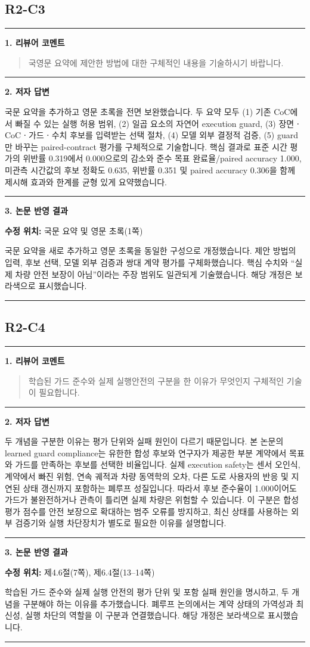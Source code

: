 \documentclass[11pt]{article}
\newcommand{\fieldheading}[2]{%
  \par\medskip\noindent
  {\color{#1}\rule{3pt}{1.25em}}\hspace{0.55em}\textbf{#2}\par\smallskip}
\newenvironment{reviewitem}[1]
  {\subsection*{#1}}
  {\par\medskip\hrule\bigskip}
\newenvironment{reviewercomment}
  {\fieldheading{reviewercolor}{1. 리뷰어 코멘트}%
   \begin{quote}}
  {\end{quote}}
\newenvironment{authorresponse}
  {\fieldheading{responsecolor}{2. 저자 답변}}
  {\par}
\newenvironment{manuscriptrevision}[1]
  {\fieldheading{revisioncolor}{3. 논문 반영 결과}%
   \textbf{수정 위치:} #1\par\smallskip}
  {\par}
\begin{document}
\begin{reviewitem}{R2-C3}
  \begin{reviewercomment}
    국영문 요약에 제안한 방법에 대한 구체적인 내용을 기술하시기 바랍니다.
  \end{reviewercomment}

  \begin{authorresponse}
    국문 요약을 추가하고 영문 초록을 전면 보완했습니다. 두 요약 모두 (1) 기존
    CoC에서 빠질 수 있는 실행 허용 범위, (2) 일곱 요소의 자연어 execution guard,
    (3) 장면ㆍCoCㆍ가드ㆍ수치 후보를 입력받는 선택 절차, (4) 모델 외부 결정적
    검증, (5) guard만 바꾸는 paired-contract 평가를 구체적으로 기술합니다.
    핵심 결과로 표준 시간 평가의 위반률 0.319에서 0.000으로의 감소와 준수 목표
    완료율/paired accuracy 1.000, 미관측 시간값의 후보 정확도 0.635, 위반률
    0.351 및 paired accuracy 0.306을 함께 제시해 효과와 한계를 균형 있게
    요약했습니다.
  \end{authorresponse}

  \begin{manuscriptrevision}{국문 요약 및 영문 초록(1쪽)}
    국문 요약을 새로 추가하고 영문 초록을 동일한 구성으로 개정했습니다. 제안
    방법의 입력, 후보 선택, 모델 외부 검증과 쌍대 계약 평가를 구체화했습니다.
    핵심 수치와 ``실제 차량 안전 보장이 아님''이라는 주장 범위도 일관되게
    기술했습니다. 해당 개정은 보라색으로 표시했습니다.
  \end{manuscriptrevision}
\end{reviewitem}

\begin{reviewitem}{R2-C4}
  \begin{reviewercomment}
    학습된 가드 준수와 실제 실행안전의 구분을 한 이유가 무엇인지 구체적인 기술이
    필요합니다.
  \end{reviewercomment}

  \begin{authorresponse}
    두 개념을 구분한 이유는 평가 단위와 실패 원인이 다르기 때문입니다. 본 논문의
    learned guard compliance는 유한한 합성 후보와 연구자가 제공한 부분 계약에서
    목표와 가드를 만족하는 후보를 선택한 비율입니다. 실제 execution safety는
    센서 오인식, 계약에서 빠진 위험, 연속 궤적과 차량 동역학의 오차, 다른 도로
    사용자의 반응 및 지연된 상태 갱신까지 포함하는 폐루프 성질입니다. 따라서
    후보 준수율이 1.000이어도 가드가 불완전하거나 관측이 틀리면 실제 차량은
    위험할 수 있습니다. 이 구분은 합성 평가 점수를 안전 보장으로 확대하는 범주
    오류를 방지하고, 최신 상태를 사용하는 외부 검증기와 실행 차단장치가 별도로
    필요한 이유를 설명합니다.
  \end{authorresponse}

  \begin{manuscriptrevision}{제4.6절(7쪽), 제6.4절(13--14쪽)}
    학습된 가드 준수와 실제 실행 안전의 평가 단위 및 포함 실패 원인을 명시하고,
    두 개념을 구분해야 하는 이유를 추가했습니다. 폐루프 논의에서는 계약 상태의
    가역성과 최신성, 실행 차단의 역할을 이 구분과 연결했습니다. 해당 개정은
    보라색으로 표시했습니다.
  \end{manuscriptrevision}
\end{reviewitem}
\end{document}
